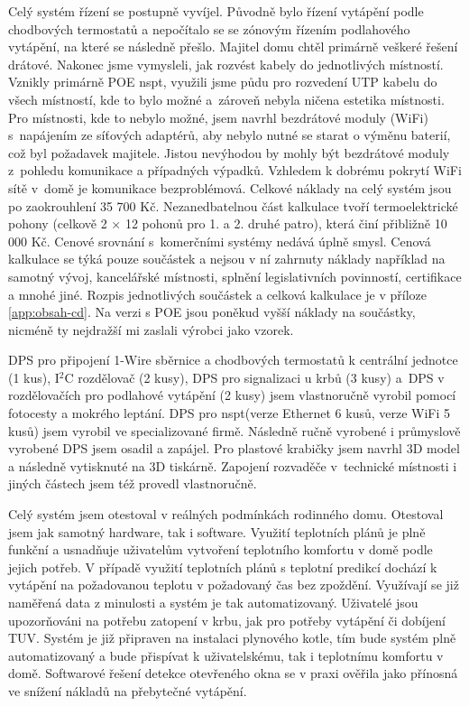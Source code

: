 Celý systém řízení se postupně vyvíjel. Původně bylo řízení vytápění podle chodbových termostatů a nepočítalo se se zónovým řízením podlahového vytápění, na které se následně přešlo. Majitel domu chtěl primárně veškeré řešení drátové. Nakonec jsme vymysleli, jak rozvést kabely do jednotlivých místností. Vznikly primárně POE \acrshort{nspt}, využili jsme půdu pro rozvedení UTP kabelu do všech místností, kde to bylo možné a~zároveň nebyla ničena estetika místnosti. Pro místnosti, kde to nebylo možné, jsem navrhl bezdrátové moduly (WiFi) s~napájením ze síťových adaptérů, aby nebylo nutné se starat o výměnu baterií, což byl požadavek majitele. Jistou nevýhodou by mohly být bezdrátové moduly z~pohledu komunikace a případných výpadků. Vzhledem k dobrému pokrytí WiFi sítě v~domě je komunikace bezproblémová. Celkové náklady na celý systém jsou po zaokrouhlení 35 700 Kč. Nezanedbatelnou část kalkulace tvoří termoelektrické pohony (celkově 2 × 12 pohonů pro 1. a 2. druhé patro), která činí přibližně 10 000 Kč. Cenové srovnání s~komerčními systémy nedává úplně smysl. Cenová kalkulace se týká pouze součástek a nejsou v ní zahrnuty náklady například na samotný vývoj, kancelářské místnosti, splnění legislativních povinností, certifikace a mnohé jiné. Rozpis jednotlivých součástek a celková kalkulace je v příloze \ref{app:obsah-cd}.  Na verzi s POE jsou poněkud vyšší náklady na součástky, nicméně ty nejdražší mi zaslali výrobci jako vzorek.

DPS pro připojení 1-Wire sběrnice a chodbových termostatů k centrální jednotce (1 kus), I$^{2}$C rozdělovač (2 kusy), DPS pro signalizaci u krbů (3 kusy) a~DPS v rozdělovačích pro podlahové vytápění (2 kusy) jsem vlastnoručně vyrobil pomocí fotocesty a mokrého leptání. DPS pro \acrshort{nspt}(verze Ethernet 6 kusů, verze WiFi 5 kusů) jsem vyrobil ve specializované firmě. Následně ručně vyrobené i průmyslově vyrobené DPS jsem osadil a zapájel. Pro plastové krabičky jsem navrhl 3D model a následně vytisknuté na 3D tiskárně. Zapojení rozvaděče v~technické místnosti i jiných částech jsem též provedl vlastnoručně.

Celý systém jsem otestoval v reálných podmínkách rodinného domu. Otestoval jsem jak samotný hardware, tak i software. Využití teplotních plánů je plně funkční a usnadňuje uživatelům vytvoření teplotního komfortu v domě podle jejich potřeb. V případě využití teplotních plánů s teplotní predikcí dochází k vytápění na požadovanou teplotu v požadovaný čas bez zpoždění. Využívají se již naměřená data z minulosti a systém je tak automatizovaný. Uživatelé jsou upozorňováni na potřebu zatopení v krbu, jak pro potřeby vytápění či dobíjení TUV. Systém je již připraven na instalaci plynového kotle, tím bude systém plně automatizovaný a bude přispívat k uživatelskému, tak i teplotnímu komfortu v domě. Softwarové řešení detekce otevřeného okna se v praxi ověřila jako přínosná ve snížení nákladů na přebytečné vytápění.

